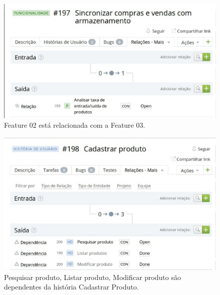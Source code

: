 \begin{figure}[!htpb]
\centering
\includegraphics[scale=0.45]{figuras/gerenciamento/us}
\caption{Feature 02 está relacionada com a Feature 03.}
\end{figure}

\begin{figure}[!htpb]
\centering
\includegraphics[scale=0.45]{figuras/gerenciamento/foto}
\caption{Pesquisar produto, Listar produto, Modificar produto são dependentes da história Cadastrar Produto.}
\end{figure}